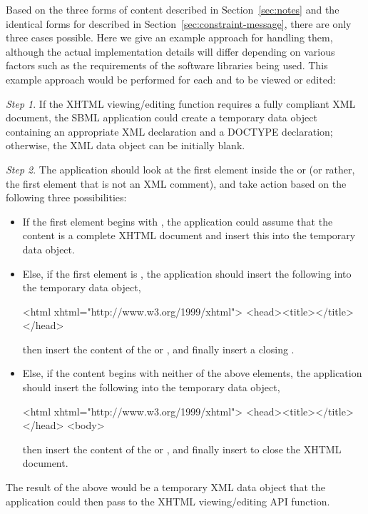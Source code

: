 Based on the three forms of \SBase {} content described in
Section~\ref{sec:notes} and the identical forms for
\Constraint {} described in Section~\ref{sec:constraint-message},
there are only three cases possible.
Here we give an example approach for handling them, although the
actual implementation details will differ depending on various
factors such as the requirements of the software libraries being
used.  This example approach would be performed for each
 and  to be viewed or edited:
\begin{description}
  
\item \emph{Step 1}. If the XHTML viewing/editing function
  requires a fully compliant XML document, the SBML application
  could create a temporary data object containing an appropriate
  XML declaration and a DOCTYPE declaration; otherwise, the XML
  data object can be initially blank.
  
\item \emph{Step 2}. The application should look at the first
  element inside the  or 
  (or rather, the first element
  that is not an XML comment), and take action based on the
  following three possibilities:
  \begin{itemize}\setlength{\parskip}{1.5ex}
    
  \item If the first element begins with
    , the
    application could assume that the content is a complete XHTML
    document and insert this into the temporary data object.
    
  \item Else, if the first element is , the
    application should insert the following into the temporary
    data object, 

    \begin{example}
<html xhtml="http://www.w3.org/1999/xhtml">
    <head><title></title></head>\end{example}
    then insert the content of the  
    or , and finally
    insert a closing .
    
  \item Else, if the content begins with neither of
    the above elements, the application should insert the
    following into the temporary data object,

    \begin{example}
<html xhtml="http://www.w3.org/1999/xhtml">
    <head><title></title></head>
    <body>\end{example}
    then insert the content of the  or , and finally
    insert  to close the XHTML document.
  \end{itemize}

\end{description}
The result of the above would be a temporary XML data object that
the application could then pass to the XHTML viewing/editing API
function.

